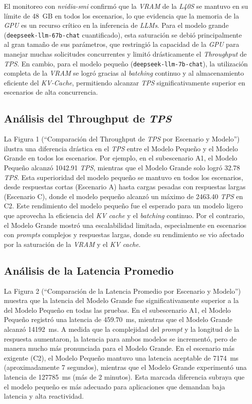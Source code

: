 El monitoreo con \textit{nvidia-smi} confirmó que la \textit{VRAM} de la \textit{L40S} se mantuvo en su límite de 48~GB en todos los escenarios, lo que evidencia que la memoria de la \textit{GPU} es un recurso crítico en la inferencia de \textit{LLMs}. Para el modelo grande (\texttt{deepseek-llm-67b-chat} cuantificado), esta saturación se debió principalmente al gran tamaño de sus parámetros, que restringió la capacidad de la \textit{GPU} para manejar muchas solicitudes concurrentes y limitó drásticamente el \textit{Throughput} de \textit{TPS}. En cambio, para el modelo pequeño (\texttt{deepseek-llm-7b-chat}), la utilización completa de la \textit{VRAM} se logró gracias al \textit{batching} continuo y al almacenamiento eficiente del \textit{KV-Cache}, permitiendo alcanzar \textit{TPS} significativamente superior en escenarios de alta concurrencia.


\subsection*{Análisis del Throughput de \textit{TPS}}
La Figura 1 (``Comparación del Throughput de \textit{TPS} por Escenario y Modelo'') ilustra una diferencia drástica en el \textit{TPS} entre el Modelo Pequeño y el Modelo Grande en todos los escenarios. Por ejemplo, en el subescenario A1, el Modelo Pequeño alcanzó 1042.91 \textit{TPS}, mientras que el Modelo Grande solo logró 32.78 \textit{TPS}. Esta superioridad del modelo pequeño se mantuvo en todos los escenarios, desde respuestas cortas (Escenario A) hasta cargas pesadas con respuestas largas (Escenario C), donde el modelo pequeño alcanzó un máximo de 2463.40 \textit{TPS} en C2. Este rendimiento del modelo pequeño fue el esperado para un modelo ligero que aprovecha la eficiencia del \textit{KV cache} y el \textit{batching} continuo. Por el contrario, el Modelo Grande mostró una escalabilidad limitada, especialmente en escenarios con \textit{prompts} complejos y respuestas largas, donde su rendimiento se vio afectado por la saturación de la \textit{VRAM} y el \textit{KV cache}.

\subsection*{Análisis de la Latencia Promedio}
La Figura 2 (``Comparación de la Latencia Promedio por Escenario y Modelo'') muestra que la latencia del Modelo Grande fue significativamente superior a la del Modelo Pequeño en todas las pruebas. En el subescenario A1, el Modelo Pequeño registró una latencia de 459.70~ms, mientras que el Modelo Grande alcanzó 14192~ms. A medida que la complejidad del \textit{prompt} y la longitud de la respuesta aumentaron, la latencia para ambos modelos se incrementó, pero de manera mucho más pronunciada para el Modelo Grande. En el escenario más exigente (C2), el Modelo Pequeño mantuvo una latencia aceptable de 7174~ms (aproximadamente 7 segundos), mientras que el Modelo Grande experimentó una latencia de 127785~ms (más de 2 minutos). Esta marcada diferencia subraya que el modelo pequeño es más adecuado para aplicaciones que demandan baja latencia y alta reactividad.

